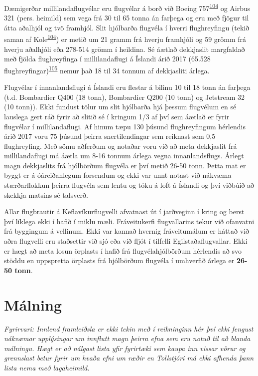 \documentclass[icelandic,]{book}
\begin{document}
Dæmigerðar millilandaflugvélar eru flugvélar á borð við Boeing 757\textsuperscript{\protect\hyperlink{ref-kole2017wear}{104}} og Airbus 321 (pers. heimild) sem vega frá 30 til 65 tonna án farþega og eru með fjögur til átta aðalhjól og tvö framhjól. Slit hjólbarða flugvéla í hverri flughreyfingu (tekið saman af Kole\textsuperscript{\protect\hyperlink{ref-kole2017wear}{104}}) er metið um 21 gramm frá hverju framhjóli og 59 grömm frá hverju aðalhjóli eða 278-514 grömm í heildina. Sé áætlað dekkjaslit margfaldað með fjölda flughreyfinga í millilandaflugi á Íslandi árið 2017 (65.528 flughreyfingar)\textsuperscript{\protect\hyperlink{ref-isavia2017}{105}} nemur það 18 til 34 tonnum af dekkjasliti árlega.

Flugvélar í innanlandsflugi á Íslandi eru flestar á bilinu 10 til 18 tonn án farþega (t.d. Bombardier Q400 (18 tonn), Bombardier Q200 (10 tonn) og Jetstream 32 (10 tonn)). Ekki fundust tölur um slit hjólbarða hjá þessum flugvélum en sé lauslega gert ráð fyrir að slitið sé í kringum 1/3 af því sem áætlað er fyrir flugvélar í millilandaflugi. Af hinum tæpu 130 þúsund flughreyfingum hérlendis árið 2017 voru 75 þúsund þeirra snertilendingar sem reiknast sem 0,5 flughreyfing. Með sömu aðferðum og notaðar voru við að meta dekkjaslit frá millilandaflugi má áætla um 8-16 tonnum árlega vegna innanlandsflugs. Árlegt magn dekkjaslits frá hjólbörðum flugvéla er því metið 26-50 tonn. Þetta mat er byggt er á óáreiðanlegum forsendum og ekki var unnt notast við nákvæma stærðarflokkun þeirra flugvéla sem lentu og tóku á loft á Íslandi og því viðbúið að skekkja matsins sé talsverð.

Allar flugbrautir á Keflavíkurflugvelli afvatnast út í jarðveginn í kring og berst því líklega ekki í hafið í miklu mæli. Fráveitukerfi flugvallarins tekur við ofanvatni frá byggingum á vellinum. Ekki var kannað hvernig fráveitumálum er háttað við aðra flugvelli eru staðsettir við sjó eða við fljót í tilfelli Egilstaðaflugvallar. Ekki er hægt að meta losun örplasts í hafið frá flugvélahjólbörðum hérlendis að svo stöddu en uppspretta örplasts frá hjólbörðum flugvéla í umhverfið árlega er \textbf{26-50 tonn}.

\hypertarget{malning}{%
\section*{Málning}\label{malning}}

\emph{Fyrirvari: Innlend framleiðsla er ekki tekin með í reikninginn hér því ekki fengust nákvæmar upplýsingar um innflutt magn þeirra efna sem eru notuð til að blanda málningu. Hægt er að nálgast lista yfir fyrirtæki sem kaupa inn vissar vörur og grennslast betur fyrir um hvaða efni um ræðir en Tollstjóri má ekki afhenda þann lista nema með lagaheimild.}
\end{document}
